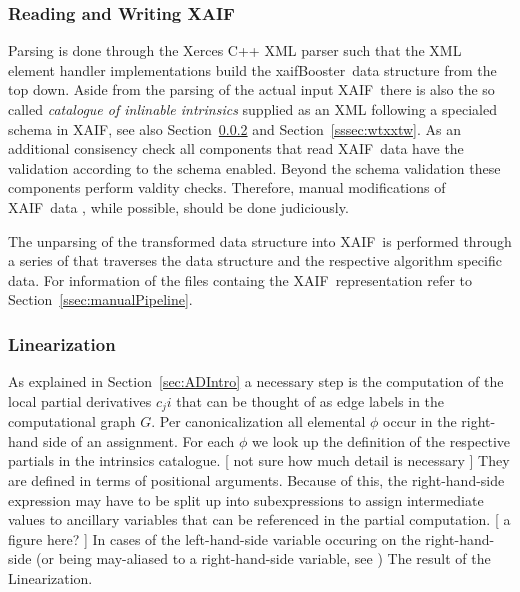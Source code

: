 \documentclass[acmtocl,acmnow]{acmtrans2m}
\newcommand{\xaif}{XAIF}
\newcommand{\xaifBooster}{xaifBooster}
\newcommand{\refsec}[1]{Section~\ref{#1}}
\begin{document}
\subsubsection{Reading and Writing \xaif}
Parsing is done through the Xerces C++ XML parser \cite{xercesWeb}
such that the XML element handler implementations build the \xaifBooster\ data 
structure 
from the top down. 
Aside from the parsing of the actual input \xaif\ there is also the so called 
{\em 
catalogue of inlinable intrinsics
} 
supplied as an XML following a specialed schema in \xaif, see also 
\refsec{sssec:linearization} and \refsec{sssec:wtxxtw}.
As an additional consisency check all components that read \xaif\ data 
have the validation according to the schema enabled. Beyond the schema 
validation these components perform valdity checks. Therefore, 
manual modifications of \xaif\ data , while possible, should 
be done judiciously. 

The unparsing of the transformed data structure into \xaif\ is performed 
through a series of that traverses the data structure and the 
respective algorithm specific data. 
For information of the files containg the \xaif\ representation refer to 
\refsec{ssec:manualPipeline}.

\subsubsection{Linearization}\label{sssec:linearization}

As explained in \refsec{sec:ADIntro} a necessary step is the computation of 
the local partial derivatives $c_ji$ that can be thought of as edge labels 
in the computational graph $G$. Per canonicalization all elemental $\phi$ 
occur in the right-hand side of an assignment. 
For each $\phi$ we look up the definition of the respective partials in 
the intrinsics catalogue. 
{\color{Red} [ not sure  how much detail is necessary ] } 
They are defined in terms of positional arguments. Because of this, 
the right-hand-side expression may have to be split up into 
subexpressions to assign intermediate values to ancillary variables 
that can be referenced in the partial computation.  
{\color{Red} [ a figure here? ] }
In cases of the left-hand-side variable occuring on the right-hand-side (or being 
may-aliased to a right-hand-side variable, see )
The result of the Linearization. 
 
\end{document}
